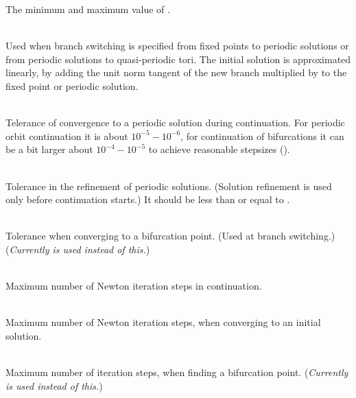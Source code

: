 \documentclass[10pt,a4paper]{ddedoc}
\begin{document}
\begin{description}
The minimum and maximum value of .
%
\item[\funp{DSSTART}] ~\\
Used when branch switching is specified from fixed points to periodic solutions or from periodic solutions to quasi-periodic tori. The initial solution is approximated linearly, by adding the unit norm tangent of the new branch multiplied by  to the fixed point or periodic solution.
%
\item[\funp{EPSC}] ~\\
Telerance of convergence to a periodic solution during continuation. For periodic orbit continuation it is about $10^{-5} - 10^{-6}$, for continuation of bifurcations it can be a bit larger about $10^{-4} - 10^{-5}$ to achieve reasonable stepsizes ().
%
\item[\funp{EPSR}] ~\\
Tolerance in the refinement of periodic solutions. (Solution refinement is used only before continuation starts.) It should be less than or equal to .
%
\item[\funp{EPSS}] ~\\
Tolerance when converging to a bifurcation point. (Used at branch switching.) (\emph{Currently  is used instead of this.})
%
\item[\funp{NITC}] ~\\
Maximum number of Newton iteration steps in continuation.
%
\item[\funp{NITR}] ~\\
Maximum number of Newton iteration steps, when converging to an initial solution.
%
\item[\funp{NITS}] ~\\
Maximum number of iteration steps, when finding a bifurcation point. (\emph{Currently  is used instead of this.})
%
\end{description}
\end{document}
